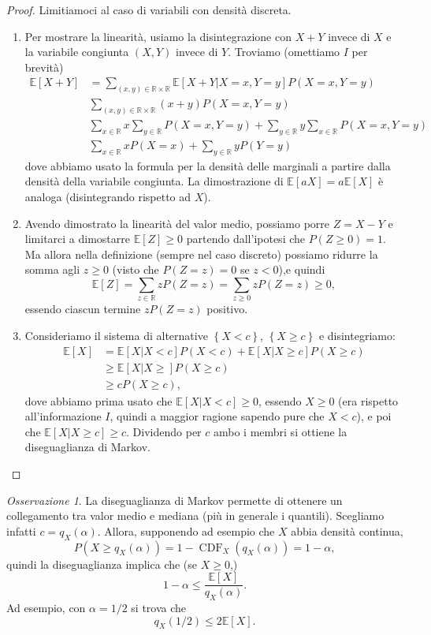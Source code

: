 \documentclass[
  italian,
  letterpaper,
]{book}
\newcommand{\sqa}[1]{\left[ #1 \right]}
\newcommand{\cur}[1]{\left\{ #1 \right\}}
\newcommand{\R}{\mathbb{R}}
\newcommand{\E}[1]{\mathbb{E}\sqa{#1}}
\newcommand{\CDF}{\operatorname{CDF}}
\theoremstyle{definition}
\theoremstyle{remark}
\newtheorem*{remark}{Osservazione}
\begin{document}
\begin{proof}
Limitiamoci al caso di variabili con densità discreta.

\begin{enumerate}
\def\labelenumi{\arabic{enumi}.}
\item
  Per mostrare la linearità, usiamo la disintegrazione con \(X+Y\)
  invece di \(X\) e la variabile congiunta \((X,Y)\) invece di \(Y\).
  Troviamo (omettiamo \(I\) per brevità)
  \[ \begin{split} \E{X+Y} & = \sum_{(x,y)\in \R \times \R} \E{X+Y| X=x, Y=y} P(X=x, Y=y) \\
  & \sum_{(x,y)\in \R \times \R} (x+y) P(X=x, Y=y)\\
  &\sum_{x \in \R } x \sum_{y \in \R } P(X=x, Y=y) + \sum_{y \in \R } y \sum_{x \in \R } P(X=x, Y=y) \\
  & \sum_{x \in \R} x P(X=x) + \sum_{y \in \R} y P(Y=y)\end{split}\]
  dove abbiamo usato la formula per la densità delle marginali a partire
  dalla densità della variabile congiunta. La dimostrazione di
  \(\E{aX}= a \E{X}\) è analoga (disintegrando rispetto ad \(X\)).
\item
  Avendo dimostrato la linearità del valor medio, possiamo porre
  \(Z = X-Y\) e limitarci a dimostarre \(\E{Z} \ge 0\) partendo
  dall'ipotesi che \(P(Z\ge 0) = 1\). Ma allora nella definizione
  (sempre nel caso discreto) possiamo ridurre la somma agli \(z \ge 0\)
  (visto che \(P(Z = z) = 0\) se \(z<0\)),e quindi
  \[ \E{Z}=  \sum_{z \in \R} z P(Z= z) =  \sum_{z \ge 0} z P(Z=z) \ge 0,\]
  essendo ciascun termine \(z P(Z=z)\) positivo.
\item
  Consideriamo il sistema di alternative \(\cur{X<c}\),
  \(\cur{X \ge c}\) e disintegriamo:
  \[\begin{split} \E{X} & =\E{X|X<c} P(X<c) + \E{X| X \ge c} P(X \ge c)\\
  & \ge  \E{X| X \ge } P(X \ge c) \\
  & \ge c P(X \ge c),\end{split}\] dove abbiamo prima usato che
  \(\E{X|X<c} \ge 0\), essendo \(X \ge 0\) (era rispetto
  all'informazione \(I\), quindi a maggior ragione sapendo pure che
  \(X<c\)), e poi che \(\E{X| X \ge c} \ge c\). Dividendo per \(c\) ambo
  i membri si ottiene la diseguaglianza di Markov.
\end{enumerate}

\end{proof}

\begin{remark}
La diseguaglianza di Markov permette di ottenere un collegamento tra
valor medio e mediana (più in generale i quantili). Scegliamo infatti
\(c= q_X(\alpha)\). Allora, supponendo ad esempio che \(X\) abbia
densità continua,
\[P(X \ge q_X(\alpha) )= 1-\CDF_X(q_X(\alpha)) = 1-\alpha,\] quindi la
diseguaglianza implica che (se \(X\ge 0\),)
\[ 1-\alpha \le \frac{ \E{X}}{q_X(\alpha)}.\] Ad esempio, con
\(\alpha = 1/2\) si trova che \[ q_X(1/2) \le 2 \E{X}.\]
\end{remark}
\end{document}
